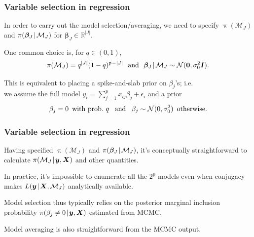 \documentclass[18pt, handout]{beamer}
\newcommand{\defineTightSpacing}{%
	\setlength{\abovedisplayskip}{.25\baselineskip}%
	\setlength{\belowdisplayskip}{.25\baselineskip}%
}
\renewcommand{\textsc}[1]{{\small \MakeUppercase{#1}}}
\newcommand{\given}{\mskip.7\thinmuskip | \mskip.7\thinmuskip}
\newcommand{\thinnerspace}{\mskip.5\thinmuskip}
\newcommand{\indicator}{\operatorname{\mathds{1}}}
\newcommand{\normalDist}{\operatorname{\mathcal{N}}}
\newcommand{\nPred}{p}
\newcommand{\density}{\operatorname{\pi}}
\newcommand{\likelihood}{L}
\newcommand{\by}{\bm{y}}
\newcommand{\bX}{\bm{X}}
\newcommand{\bbeta}{\bm{\beta}}
\newcommand{\model}{\mathcal{M}}
\newcommand{\nonzeroCoefSet}{J}
\newcommand{\inclusionProb}{q}
\begin{document}
\begin{frame}
\frametitle{Variable selection in regression}
In order to carry out the model selection/averaging, we need to specify $\density(\model_\nonzeroCoefSet)$ and $\density(\bbeta_\nonzeroCoefSet \given \model_\nonzeroCoefSet)$ for $\bbeta_\nonzeroCoefSet \in \mathbb{R}^{|\nonzeroCoefSet|}$. 

\smallskip
One common choice is, for $\inclusionProb \in (0, 1)$,
\begin{equation*} \defineTightSpacing%
\density(\model_\nonzeroCoefSet) = \inclusionProb^{|\nonzeroCoefSet|} (1 - \inclusionProb)^{\nPred \thinnerspace - |\nonzeroCoefSet|}
	\ \text{ and } \ 
	\bbeta_\nonzeroCoefSet \given \model_\nonzeroCoefSet \sim \normalDist(\bm{0}, \sigma_0^2 \bm{I}).
\end{equation*}

This is equivalent to placing a spike-and-slab prior on $\beta_j$'s; i.e.\ \\ 
we assume the full model $y_i = \sum_{j = 1}^\nPred x_{ij} \beta_j + \epsilon_i$ and a prior
\begin{equation*} \defineTightSpacing%
\beta_j = 0 \, \text{ with prob.\ } \inclusionProb
	\ \, \text{ and } \ \,
	\beta_j \sim \normalDist(0, \sigma_0^2)
	\, \text{ otherwise.}
\end{equation*}


\end{frame}


\begin{frame}
\frametitle{Variable selection in regression}
Having specified $\density(\model_\nonzeroCoefSet)$ and $\density(\bbeta_\nonzeroCoefSet \given \model_\nonzeroCoefSet)$, it's conceptually straightforward to calculate $\density(\model_\nonzeroCoefSet \given \by, \bX)$ and other quantities.

In practice, it's impossible to enumerate all the $2^\nPred$ models even when conjugacy makes $\likelihood(\by \given \bX,  \model_\nonzeroCoefSet)$ analytically available.

Model selection thus typically relies on the posterior marginal inclusion probability $\density(\beta_j \neq 0 \given \by, \bX)$ estimated from \textsc{mcmc}. 

Model averaging is also straightforward from the \textsc{mcmc} output. 
\end{frame}
\end{document}
